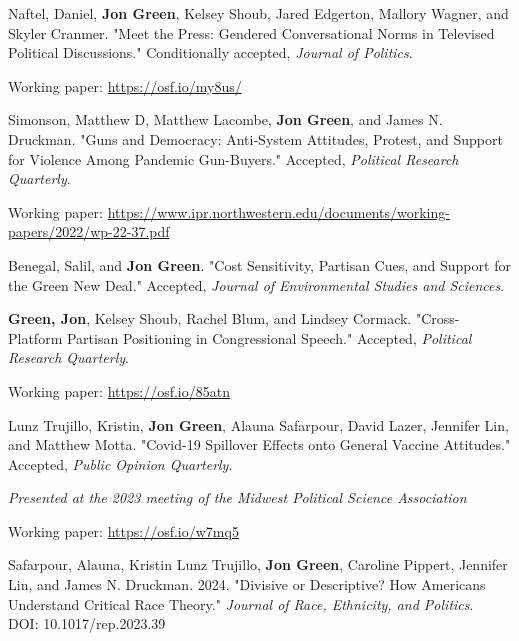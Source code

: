 \documentclass[letterpaper]{article}
\renewenvironment{itemize}{
  \begin{list}{}{
    \setlength{\leftmargin}{1.5em}
  }
}{
  \end{list}
}
\begin{document}
\begin{etaremune}

\item Naftel, Daniel, \textbf{Jon Green}, Kelsey Shoub, Jared Edgerton, Mallory Wagner, and Skyler Cranmer. "Meet the Press: Gendered Conversational Norms in Televised Political Discussions."  Conditionally accepted, \textit{Journal of Politics}.
\begin{itemize}
\item Working paper: \url{https://osf.io/my8us/}
\end{itemize}

\item Simonson, Matthew D, Matthew Lacombe, \textbf{Jon Green}, and James N. Druckman. "Guns and Democracy: Anti-System Attitudes, Protest, and Support for Violence Among Pandemic Gun-Buyers." Accepted, \textit{Political Research Quarterly}.
\begin{itemize}
\item Working paper: \url{https://www.ipr.northwestern.edu/documents/working-papers/2022/wp-22-37.pdf}
\end{itemize}

\item Benegal, Salil, and \textbf{Jon Green}. "Cost Sensitivity, Partisan Cues, and Support for the Green New Deal." Accepted, \textit{Journal of Environmental Studies and Sciences}.

\item \textbf{Green, Jon}, Kelsey Shoub, Rachel Blum, and Lindsey Cormack. "Cross-Platform Partisan Positioning in Congressional Speech." Accepted, \textit{Political Research Quarterly}.
\begin{itemize}
\item Working paper: \url{https://osf.io/85atn}
\end{itemize}

\item Lunz Trujillo, Kristin, \textbf{Jon Green}, Alauna Safarpour, David Lazer, Jennifer Lin, and Matthew Motta. "Covid-19 Spillover Effects onto General Vaccine Attitudes." Accepted, \textit{Public Opinion Quarterly}.
\begin{itemize}
\item \textit{Presented at the 2023 meeting of the Midwest Political Science Association}
\item Working paper: \url{https://osf.io/w7mq5}
\end{itemize} 

\item Safarpour, Alauna, Kristin Lunz Trujillo, \textbf{Jon Green}, Caroline Pippert, Jennifer Lin, and James N. Druckman. 2024. "Divisive or Descriptive? How Americans Understand Critical Race Theory." \textit{Journal of Race, Ethnicity, and Politics}. \\
DOI: 10.1017/rep.2023.39


\end{etaremune}
\end{document}
